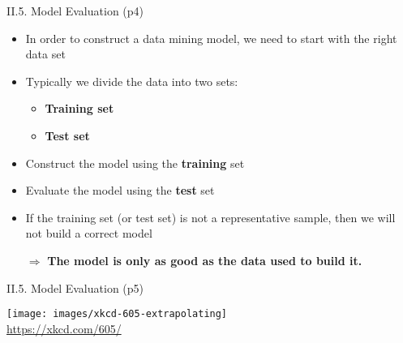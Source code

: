 \documentclass[handout]{beamer}
\newcommand{\strong}[1]{\textbf{\color{teal} #1}}
\newcommand{\stronger}[1]{\textbf{\color{purple} #1}}
\begin{document}
\begin{frame}{II.5. Model Evaluation (p4)}
\begin{itemize}
\item In order to construct a data mining model, we need to start with the right data set
\item Typically we divide the data into two sets:
	\begin{itemize}
	\item \strong{Training set}
	\item \strong{Test set}
	\end{itemize}
\item Construct the model using the \textbf{training} set
\item Evaluate the model using the \textbf{test} set
\item If the training set (or test set) is not a representative sample, then we will not build a correct model
\item[$\Rightarrow$] \stronger{The model is only as good as the data used to build it.}
\end{itemize}
\end{frame}
\begin{frame}{II.5. Model Evaluation (p5)}
\begin{center}
\texttt{[image: images/xkcd-605-extrapolating]}\\
{\footnotesize \url{https://xkcd.com/605/}}
\end{center}
\end{frame}




\end{document}
